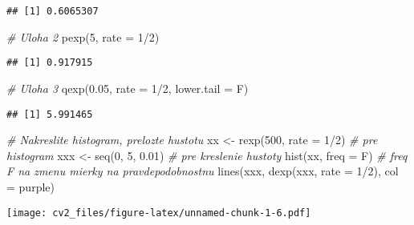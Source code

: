 \documentclass[
]{article}
\newenvironment{Shaded}{\begin{snugshade}}{\end{snugshade}}
\newcommand{\AttributeTok}[1]{\textcolor[rgb]{0.77,0.63,0.00}{#1}}
\newcommand{\CommentTok}[1]{\textcolor[rgb]{0.56,0.35,0.01}{\textit{#1}}}
\newcommand{\DecValTok}[1]{\textcolor[rgb]{0.00,0.00,0.81}{#1}}
\newcommand{\FloatTok}[1]{\textcolor[rgb]{0.00,0.00,0.81}{#1}}
\newcommand{\FunctionTok}[1]{\textcolor[rgb]{0.00,0.00,0.00}{#1}}
\newcommand{\NormalTok}[1]{#1}
\newcommand{\OtherTok}[1]{\textcolor[rgb]{0.56,0.35,0.01}{#1}}
\newcommand{\SpecialCharTok}[1]{\textcolor[rgb]{0.00,0.00,0.00}{#1}}
\newcommand{\StringTok}[1]{\textcolor[rgb]{0.31,0.60,0.02}{#1}}
\begin{document}
\begin{verbatim}
## [1] 0.6065307
\end{verbatim}

\begin{Shaded}
\begin{Highlighting}[]
\CommentTok{\# Uloha 2}
\FunctionTok{pexp}\NormalTok{(}\DecValTok{5}\NormalTok{, }\AttributeTok{rate =} \DecValTok{1}\SpecialCharTok{/}\DecValTok{2}\NormalTok{)}
\end{Highlighting}
\end{Shaded}

\begin{verbatim}
## [1] 0.917915
\end{verbatim}

\begin{Shaded}
\begin{Highlighting}[]
\CommentTok{\# Uloha 3}
\FunctionTok{qexp}\NormalTok{(}\FloatTok{0.05}\NormalTok{, }\AttributeTok{rate =} \DecValTok{1}\SpecialCharTok{/}\DecValTok{2}\NormalTok{, }\AttributeTok{lower.tail =}\NormalTok{ F)}
\end{Highlighting}
\end{Shaded}

\begin{verbatim}
## [1] 5.991465
\end{verbatim}

\begin{Shaded}
\begin{Highlighting}[]
\CommentTok{\# Nakreslite histogram, prelozte hustotu}
\NormalTok{xx }\OtherTok{\textless{}{-}} \FunctionTok{rexp}\NormalTok{(}\DecValTok{500}\NormalTok{, }\AttributeTok{rate =} \DecValTok{1}\SpecialCharTok{/}\DecValTok{2}\NormalTok{) }\CommentTok{\# pre histogram}
\NormalTok{xxx }\OtherTok{\textless{}{-}} \FunctionTok{seq}\NormalTok{(}\DecValTok{0}\NormalTok{, }\DecValTok{5}\NormalTok{, }\FloatTok{0.01}\NormalTok{) }\CommentTok{\# pre kreslenie hustoty}
\FunctionTok{hist}\NormalTok{(xx, }\AttributeTok{freq =}\NormalTok{ F) }\CommentTok{\# freq F na zmenu mierky na pravdepodobnostnu}
\FunctionTok{lines}\NormalTok{(xxx, }\FunctionTok{dexp}\NormalTok{(xxx, }\AttributeTok{rate =} \DecValTok{1}\SpecialCharTok{/}\DecValTok{2}\NormalTok{), }\AttributeTok{col =} \StringTok{\textquotesingle{}purple\textquotesingle{}}\NormalTok{)}
\end{Highlighting}
\end{Shaded}

\texttt{[image: cv2\_files/figure-latex/unnamed-chunk-1-6.pdf]}
\end{document}
